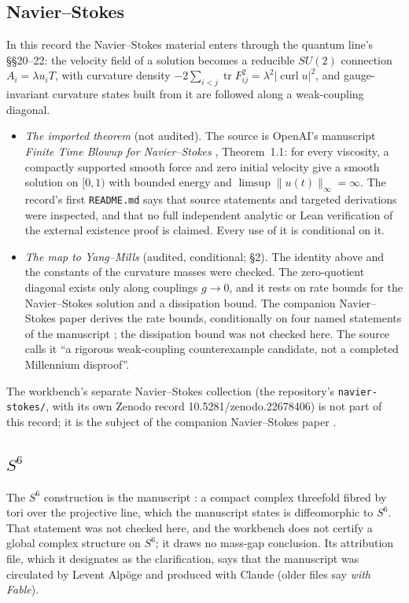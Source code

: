 \subsection{Navier--Stokes}

In this record the Navier--Stokes material enters through the quantum line's §§20--22: the velocity field of a solution becomes a reducible $SU(2)$ connection $A_i=\lambda u_iT$, with curvature density $-2\sum_{i<j}\operatorname{tr}F_{ij}^2=\lambda^2|\operatorname{curl}u|^2$, and gauge-invariant curvature states built from it are followed along a weak-coupling diagonal.
\begin{itemize}
\item \emph{The imported theorem} (not audited). The source is OpenAI's manuscript \emph{Finite Time Blowup for Navier--Stokes} \cite{OpenAINS}, Theorem~1.1: for every viscosity, a compactly supported smooth force and zero initial velocity give a smooth solution on $[0,1)$ with bounded energy and $\limsup\|u(t)\|_\infty=\infty$. The record's first \texttt{README.md} says that source statements and targeted derivations were inspected, and that no full independent analytic or Lean verification of the external existence proof is claimed. Every use of it is conditional on it.
\item \emph{The map to Yang--Mills} (audited, conditional;  §2). The identity above and the constants of the curvature masses were checked. The zero-quotient diagonal exists only along couplings $g\to0$, and it rests on rate bounds for the Navier--Stokes solution and a dissipation bound. The companion Navier--Stokes paper derives the rate bounds, conditionally on four named statements of the manuscript \cite[Theorem~3.1]{NSPaper}; the dissipation bound was not checked here. The source calls it ``a rigorous weak-coupling counterexample candidate, not a completed Millennium disproof''.
\end{itemize}
The workbench's separate Navier--Stokes collection (the repository's \texttt{navier-stokes/}, with its own Zenodo record 10.5281/zenodo.22678406) is not part of this record; it is the subject of the companion Navier--Stokes paper \cite{NSPaper}.

\subsection{\texorpdfstring{$S^6$}{S6}}

The $S^6$ construction is the manuscript \cite{AlpogeS6}: a compact complex threefold fibred by tori over the projective line, which the manuscript states is diffeomorphic to $S^6$. That statement was not checked here, and the workbench does not certify a global complex structure on $S^6$; it draws no mass-gap conclusion. Its attribution file, which it designates as the clarification, says that the manuscript was circulated by Levent Alpöge and produced with Claude (older files say \emph{with Fable}).

